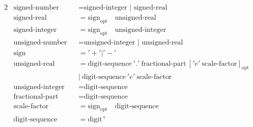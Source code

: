 \documentclass{article}
\begin{document}
\begin{alignat*}{2}
&\text{signed-number} &&= \text{signed-integer | signed-real} \\
&\text{signed-real} &&= \text{sign}_{\text{opt}} \quad \text{unsigned-real} \\
&\text{signed-integer} &&= \text{sign}_{\text{opt}} \quad \text{unsigned-integer} \\
&\text{unsigned-number} &&= \text{unsigned-integer | unsigned-real} \\
&\text{sign} &&= '+' | '-' \\
&\text{unsigned-real} &&= \text{digit-sequence}\ '.'\ \text{fractional-part}\ {['e'\ \text{scale-factor}]}_\text{opt}\\
&&& |\ \text{digit-sequence}\ 'e'\ \text{scale-factor} \\
&\text{unsigned-integer} &&= \text{digit-sequence} \\
&\text{fractional-part} &&= \text{digit-sequence} \\
&\text{scale-factor} &&= \text{sign}_\text{opt}\quad\text{digit-sequence} \\
&\text{digit-sequence} &&= \text{digit}^+
\end{alignat*}
\end{document}
